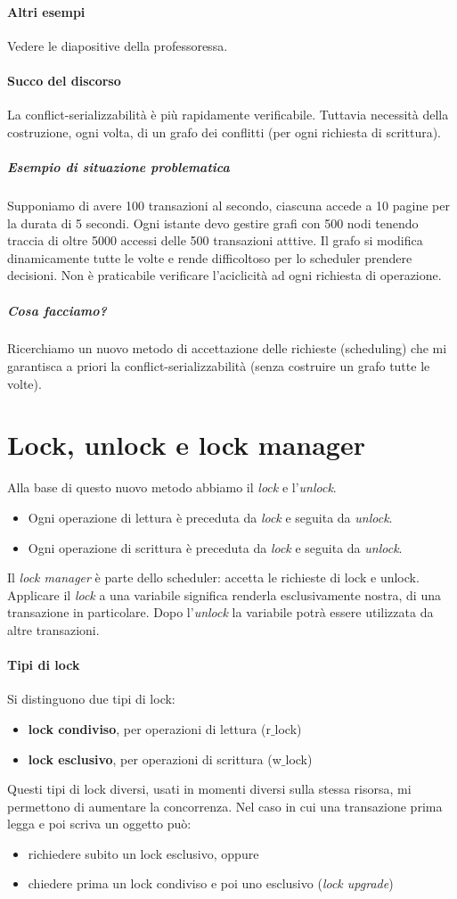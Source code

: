 \paragraph{Altri esempi} Vedere le diapositive della professoressa.
\paragraph{Succo del discorso} La conflict-serializzabilità è più rapidamente verificabile. Tuttavia necessità della costruzione, ogni volta, di un grafo dei conflitti (per ogni richiesta di scrittura). 
\subparagraph{Esempio di situazione problematica} Supponiamo di avere 100 transazioni al secondo, ciascuna accede a 10 pagine per la durata di 5 secondi. Ogni istante devo gestire grafi con 500 nodi tenendo traccia di oltre 5000 accessi delle 500 transazioni atttive. Il grafo si modifica dinamicamente tutte le volte e rende difficoltoso per lo scheduler prendere decisioni. Non è praticabile verificare l'aciclicità ad ogni richiesta di operazione.
\subparagraph{Cosa facciamo?} Ricerchiamo un nuovo metodo di accettazione delle richieste (scheduling) che mi garantisca a priori la conflict-serializzabilità (senza costruire un grafo tutte le volte).

\section{Lock, unlock e lock manager}
Alla base di questo nuovo metodo abbiamo il \emph{lock} e l'\emph{unlock}.
\begin{itemize}
	\item Ogni operazione di lettura è preceduta da \emph{lock} e seguita da \emph{unlock}.
	\item Ogni operazione di scrittura è preceduta da \emph{lock} e seguita da \emph{unlock}.
\end{itemize}
Il \emph{lock manager} è parte dello scheduler: accetta le richieste di lock e unlock. Applicare il \emph{lock} a una variabile significa renderla esclusivamente nostra, di una transazione in particolare. Dopo l'\emph{unlock} la variabile potrà essere utilizzata da altre transazioni.
\paragraph{Tipi di lock} Si distinguono due tipi di lock:
\begin{itemize}
	\item \textbf{lock condiviso}, per operazioni di lettura (r$\_$lock)
	\item \textbf{lock esclusivo}, per operazioni di scrittura (w$\_$lock)
\end{itemize}
Questi tipi di lock diversi, usati in momenti diversi sulla stessa risorsa, mi permettono di aumentare la concorrenza. Nel caso in cui una transazione prima legga e poi scriva un oggetto può:
\begin{itemize}
	\item richiedere subito un lock esclusivo, oppure
	\item chiedere prima un lock condiviso e poi uno esclusivo (\emph{lock upgrade})
\end{itemize}
